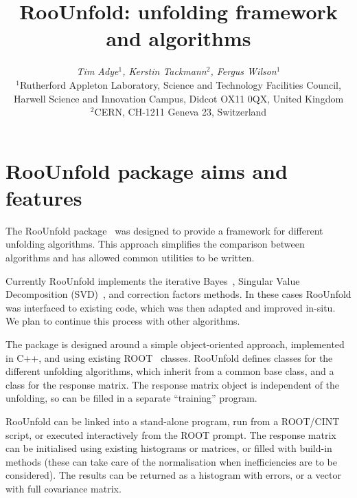 \documentclass{desyproc}
\begin{document}
\title{RooUnfold: unfolding framework and algorithms}

\author{{\slshape Tim Adye$^1$, Kerstin Tackmann$^2$, Fergus Wilson$^1$}\\[1ex]
$^1$Rutherford Appleton Laboratory, Science and Technology Facilities Council, Harwell Science and Innovation Campus, Didcot OX11 0QX, United Kingdom\\
$^2$CERN, CH-1211 Geneva 23, Switzerland}

\doi            %

\maketitle

\begin{abstract}
\end{abstract}

\section{RooUnfold package aims and features}

The RooUnfold package~\cite{RooUnfold-web} was designed to provide a framework for different unfolding algorithms.
This approach simplifies the comparison between algorithms and has allowed
common utilities to be written.

Currently RooUnfold implements the iterative Bayes~\cite{D'Agostini:1994zf},
Singular Value Decomposition (SVD)~\cite{Hocker:1995kb}, and correction factors methods.
In these cases RooUnfold was interfaced to existing code, which
was then adapted and improved in-situ. We plan to continue this process with
other algorithms.

The package is designed around a simple object-oriented approach, implemented in
C++, and using existing ROOT~\cite{Brun:1997pa} classes. RooUnfold defines classes for the different
unfolding algorithms, which inherit from a common base class, and a class for
the response matrix. The response matrix object is independent of the unfolding,
so can be filled in a separate ``training'' program.

RooUnfold can be linked into a stand-alone program, run from a ROOT/CINT script, or
executed interactively from the ROOT prompt.
The response matrix can be initialised using existing histograms or matrices, or
filled with build-in methods (these can take care of the normalisation when inefficiencies are to be considered).
The results can be returned as a histogram with errors, or a vector with full covariance matrix.
\end{document}
